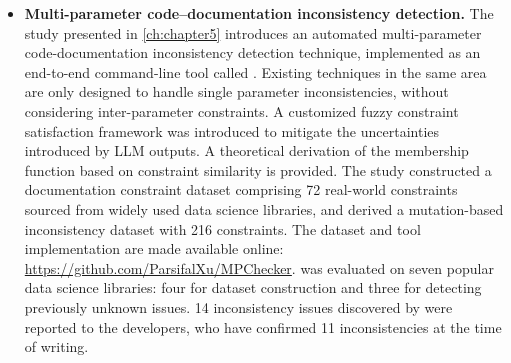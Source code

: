 \begin{itemize}
  \item \textbf{Multi-parameter code–documentation inconsistency detection.} The study presented in \cref{ch:chapter5} introduces an automated multi-parameter code-documentation inconsistency detection technique, implemented as an end-to-end command-line tool called \toolchecker. Existing techniques in the same area are only designed to handle single parameter inconsistencies, without considering inter-parameter constraints. A customized fuzzy constraint satisfaction framework was introduced to mitigate the uncertainties introduced by LLM outputs. A theoretical derivation of the membership function based on constraint similarity is provided. The study constructed a documentation constraint dataset comprising 72 real-world constraints sourced from widely used data science libraries, and derived a mutation-based inconsistency dataset with 216 constraints. The dataset and tool implementation are made available online: \url{https://github.com/ParsifalXu/MPChecker}. \toolchecker was evaluated on seven popular data science libraries: four for dataset construction and three for detecting previously unknown issues. 14 inconsistency issues discovered by \toolchecker were reported to the developers, who have confirmed 11 inconsistencies at the time of writing.
\end{itemize}

